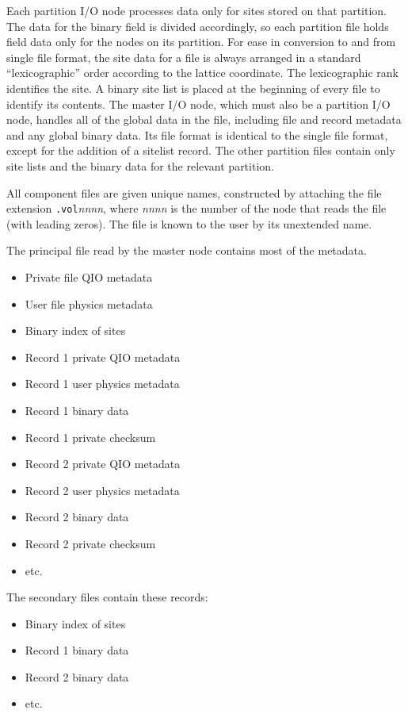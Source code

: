 \documentclass{article}
\begin{document}
Each partition I/O node processes data only for sites stored on that
partition.  The data for the binary field is divided accordingly, so
each partition file holds field data only for the nodes on its
partition.  For ease in conversion to and from single file format, the
site data for a file is always arranged in a standard
``lexicographic'' order according to the lattice coordinate.  The
lexicographic rank identifies the site.  A binary site list is placed
at the beginning of every file to identify its contents.  The master
I/O node, which must also be a partition I/O node, handles all of the
global data in the file, including file and record metadata and any
global binary data.  Its file format is identical to the single file
format, except for the addition of a sitelist record.  The other
partition files contain only site lists and the binary data for the
relevant partition.

All component files are given unique names, constructed by attaching
the file extension {\tt .vol}{\it nnnn}, where {\it nnnn} is the
number of the node that reads the file (with leading zeros).  The file
is known to the user by its unextended name.  

The principal file read by the master node contains most of the
metadata.


\begin{itemize}
  \item Private file QIO metadata
  \item User file physics metadata
  \item Binary index of sites
  \item Record 1 private QIO metadata
  \item Record 1 user physics metadata
  \item Record 1 binary data
  \item Record 1 private checksum
  \item Record 2 private QIO metadata
  \item Record 2 user physics metadata
  \item Record 2 binary data
  \item Record 2 private checksum
  \item etc.
\end{itemize}

The secondary files contain these records:

\begin{itemize}
  \item Binary index of sites
  \item Record 1 binary data
  \item Record 2 binary data
  \item etc.
\end{itemize}
\end{document}
